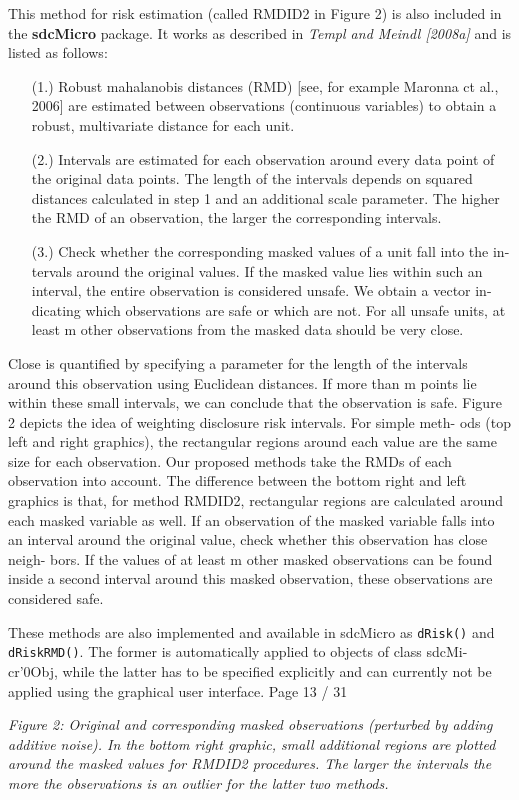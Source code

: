 \documentclass[]{article}
\begin{document}
This method for risk estimation (called RMDID2 in Figure 2) is also included
in the \textbf{sdcMicro} package. 
It works as described in \textit{Templ and Meindl [2008a]} and
is listed as follows:
\begin{itemize}
	\item[(1.)] Robust mahalanobis distances (RMD) [see, for example Maronna ct al., 2006]
	are estimated between observations (continuous variables) to obtain a robust,
	multivariate distance for each unit.
	\item[(2.)] Intervals are estimated for each observation around every data point of the
	original data points. The length of the intervals depends on squared distances
	calculated in step 1 and an additional scale parameter. The higher the RMD
	of an observation, the larger the corresponding intervals.
	\item[(3.)] Check whether the corresponding masked values of a unit fall into the in-
	tervals around the original values. If the masked value lies within such an
	interval, the entire observation is considered unsafe. We obtain a vector in-
	dicating which observations are safe or which are not. For all unsafe units,
	at least m other observations from the masked data should be very close.
\end{itemize}
Close is quantiﬁed by specifying a parameter for the length of the intervals
around this observation using Euclidean distances. If more than m points lie
within these small intervals, we can conclude that the observation is safe.
Figure 2 depicts the idea of weighting disclosure risk intervals. For simple meth-
ods (top left and right graphics), the rectangular regions around each value are
the same size for each observation. Our proposed methods take the RMDs of
each observation into account. The difference between the bottom right and left
graphics is that, for method RMDID2, rectangular regions are calculated around
each masked variable as well. If an observation of the masked variable falls into an
interval around the original value, check whether this observation has close neigh-
bors. If the values of at least m other masked observations can be found inside a
second interval around this masked observation, these observations are considered
safe.


These methods are also implemented and available in sdcMicro as \texttt{dRisk()} and
\texttt{dRiskRMD()}. The former is automatically applied to objects of class sdcMi-
cr'0Obj, while the latter has to be speciﬁed explicitly and can currently not be
applied using the graphical user interface.
\newpage
Page 13 / 31

\textit{Figure 2: Original and corresponding masked observations (perturbed by adding
	additive noise). In the bottom right graphic, small additional regions are
	plotted around the masked values for RMDID2 procedures. The larger
	the intervals the more the observations is an outlier for the latter two
	methods.}
\newpage
\end{document}
